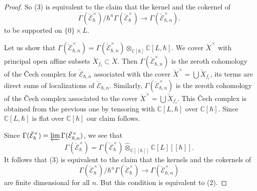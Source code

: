 \documentclass[12pt]{amsart}
\newcommand{\C}{\mathbb{C}}
\newcommand{\Ecal}{\mathcal{E}}
\theoremstyle{definition}
\numberwithin{equation}{section}
\begin{document}
\begin{proof}
So (3) is equivalent to the claim that
the kernel and the cokernel of
$$\Gamma(\breve{\Ecal}^\times_\hbar)/
\hbar^n \Gamma(\breve{\Ecal}^\times_\hbar)
\rightarrow \Gamma(\breve{\Ecal}^\times_{\hbar,n}).$$
to be supported on $\{0\}\times L$.

Let us show that $\Gamma(\breve{\Ecal}^\times_{\hbar,n})=
\Gamma(\check{\Ecal}^\times_{\hbar,n})\otimes_{\C[\hbar]}\C[L,\hbar]$.
We cover $\check{X}^\times$ with principal open affine subsets
$\check{X}_{f_i}\subset \check{X}$. Then $\Gamma(\check{\Ecal}^\times_{\hbar,n})$
is the zeroth cohomology of the \v{C}ech complex for $\check{\Ecal}_{\hbar,n}$
associated with the cover $\check{X}^\times=\bigcup \check{X}_{f_i}$, its terms
are direct sums of localizations of $\check{\Ecal}_{\hbar,n}$. Similarly,
$\Gamma(\breve{\Ecal}^\times_{\hbar,n})$ is the zeroth cohomology of the \v{C}ech
complex associated to the cover $\breve{X}^\times=\bigcup \breve{X}_{f_i}$. This \v{C}ech
complex is obtained from the previous one by tensoring with $\C[L,\hbar]$ over $\C[\hbar]$.
Since $\C[L,\hbar]$ is flat over $\C[\hbar]$ our claim follows.

Since
$\Gamma(\breve{\Ecal}^\times_\hbar)=\varprojlim \Gamma(\breve{\Ecal}^\times_{\hbar,n})$, we see that
\begin{equation}\label{eq:decomposition12}
\Gamma(\breve{\Ecal}^\times_{\hbar})=
\Gamma(\check{\Ecal}^\times_\hbar)\widehat{\otimes}_{\C[[\hbar]]}\C[L][[\hbar]].
\end{equation}
It follows that (3) is equivalent to the claim that the kernels and the cokernels of
$$\Gamma(\check{\Ecal}^\times_\hbar)/
\hbar^n \Gamma(\check{\Ecal}^\times_\hbar)
\rightarrow \Gamma(\check{\Ecal}^\times_{\hbar,n})$$
are finite dimensional for all $n$. But this condition is equivalent to (2).


\end{proof}
\end{document}
